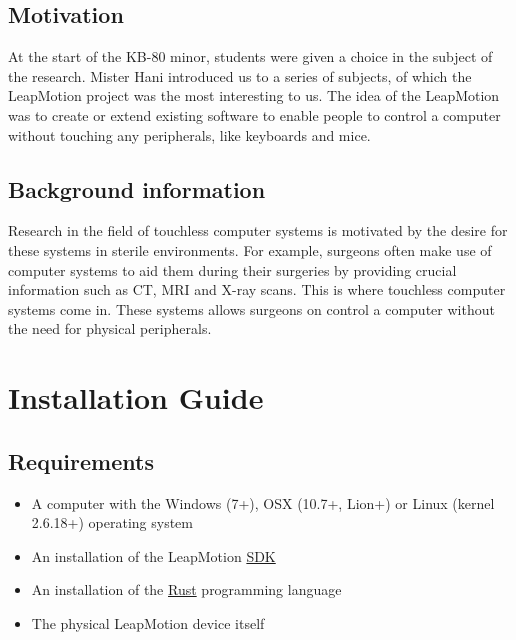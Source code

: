 \documentclass[a4paper]{article}
\providecommand{\tightlist}{%
\setlength{\itemsep}{0pt}\setlength{\parskip}{0pt}}
\begin{document}
  \subsection{Motivation}
  At the start of the KB-80 minor, students were given a choice in the subject
  of the research. Mister Hani introduced us to a series of subjects, of which
  the LeapMotion project was the most interesting to us. The idea of the
  LeapMotion was to create or extend existing software to enable people to
  control a computer without touching any peripherals, like keyboards and mice.

  \subsection{Background information}
  Research in the field of touchless computer systems is motivated by the desire
  for these systems in sterile environments. For example, surgeons often make
  use of computer systems to aid them during their surgeries by providing
  crucial information such as CT, MRI and X-ray scans. This is where touchless
  computer systems come in. These systems allows surgeons on control a computer
  without the need for physical peripherals.
  \clearpage

  \section{Installation Guide}
  \subsection{Requirements}
  \begin{itemize}
    \tightlist
    \item A computer with the Windows (7+), OSX (10.7+, Lion+) or
      Linux (kernel 2.6.18+) operating system
    \item An installation of the LeapMotion
      \href{https://developer.leapmotion.com/sdk/v2}{SDK}
    \item An installation of the
      \href{https://rust-lang.org}{Rust} programming language
    \item The physical LeapMotion device itself
  \end{itemize}
\end{document}
